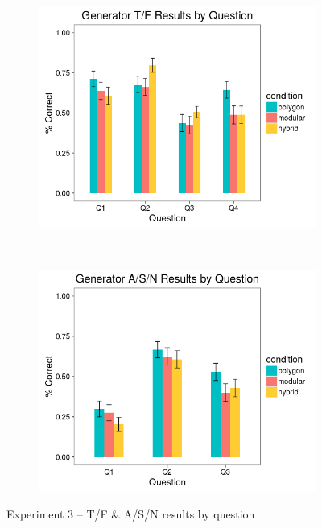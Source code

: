 \documentclass[man,mask,10pt]{apa6}
\begin{document}
\begin{figure}[H]
\centering
\begin{subfigure}[c]{0.45\textwidth}
\centering
\includegraphics[width=\textwidth]{figures/3/gen_TF_by_Q.png}
\end{subfigure}
~
\begin{subfigure}[c]{0.45\textwidth}
\centering
\includegraphics[width=\textwidth]{figures/3/gen_ASN_by_Q.png}
\end{subfigure}
\caption{Experiment 3 -- T/F \& A/S/N results by question}
\end{figure}\noindent 
\end{document}
